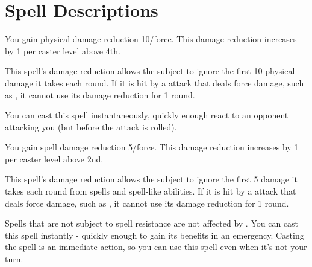\section{Spell Descriptions}

\small



\begin{comment}
\subsubsection{A}
\end{comment}

\begin{spelleffect}
    You gain physical damage reduction 10/force. This damage reduction increases by 1 per caster level above 4th.
\end{spelleffect}
\begin{spellnotes}
    This spell's damage reduction allows the subject to ignore the first 10 physical damage it takes each round. If it is hit by a attack that deals force damage, such as , it cannot use its damage reduction for 1 round.

    You can cast this spell instantaneously, quickly enough react to an opponent attacking you (but before the attack is rolled).
\end{spellnotes}

\begin{spelleffect}
    You gain spell damage reduction 5/force. This damage reduction increases by 1 per caster level above 2nd.
\end{spelleffect}
\begin{spellnotes}
    This spell's damage reduction allows the subject to ignore the first 5 damage it takes each round from spells and spell-like abilities. If it is hit by a attack that deals force damage, such as , it cannot use its damage reduction for 1 round.

    Spells that are not subject to spell resistance are not affected by . You can cast this spell instantly - quickly enough to gain its benefits in an emergency. Casting the spell is an immediate action, so you can use this spell even when it's not your turn.
\end{spellnotes}

